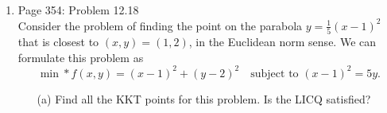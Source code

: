 \documentclass[11pt, oneside]{article}
\begin{document}
\begin{enumerate}
\begin{proof}
      At the point $x^* = (0, 0)$, all of the inequality constraints are active.
      Consider the vector $w = \br{1, 0}^T$, then
      \begin{align*}
        \nabla c_1(x^*)^T w &=
        \begin{bmatrix}
          2 & 2
        \end{bmatrix}
        \begin{bmatrix}
          1 \\
          0
        \end{bmatrix} \\
        &= 2 > 0 \\
        \nabla c_2(x^*)^T w &=
        \begin{bmatrix}
          2 & -2
        \end{bmatrix}
        \begin{bmatrix}
          1 \\
          0
        \end{bmatrix} \\
        &= 2 > 0 \\
        \nabla c_3(x^*)^T w &=
        \begin{bmatrix}
          1 & 0
        \end{bmatrix}
        \begin{bmatrix}
          1 \\
          0
        \end{bmatrix} \\
        &= 1 > 0
      \end{align*}
      This shows that these constraints satisfy the MFCQ is satisfied at $x^* = \br{0, 0}^T$.

      Now consider the LICQ, the vectors
      $\set{\nabla c_i(x^*): i \in \mcA(x^*) \cap \mcI}$ are not linearly
      independent as the set contains 3 vectors in $\RR^2$.
    \end{proof}

  \item %
    Page 354: Problem 12.18 \\
    Consider the problem of finding the point on the parabola
    $y = \frac{1}{5}(x - 1)^2$ that is closest to $(x, y) = (1, 2)$, in the
    Euclidean norm sense.
    We can formulate this problem as
    \[
      \min*{f(x, y)} = (x - 1)^2 + (y - 2)^2 \quad \text{subject to } (x - 1)^2 = 5y.
    \]
    \begin{enumerate}
      \item[(a)] %
        Find all the KKT points for this problem.
        Is the LICQ satisfied?


\end{enumerate}
\end{enumerate}
\end{document}
